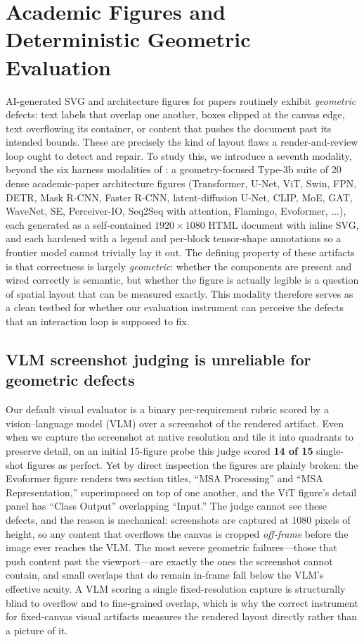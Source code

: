 \section{Academic Figures and Deterministic Geometric Evaluation}\label{sec:geometric}

AI-generated SVG and architecture figures for papers routinely exhibit
\emph{geometric} defects: text labels that overlap one another, boxes clipped at
the canvas edge, text overflowing its container, or content that pushes the
document past its intended bounds. These are precisely the kind of layout flaws a
render-and-review loop ought to detect and repair. To study this, we introduce a
seventh modality, beyond the six harness modalities of : a
geometry-focused Type-3b suite of 20 dense academic-paper architecture figures
(Transformer, U-Net, ViT, Swin, FPN, DETR, Mask R-CNN, Faster R-CNN,
latent-diffusion U-Net, CLIP, MoE, GAT, WaveNet, SE, Perceiver-IO, Seq2Seq with
attention, Flamingo, Evoformer, $\dots$), each generated as a self-contained
$1920\times1080$ HTML document with inline SVG, and each hardened with a legend
and per-block tensor-shape annotations so a frontier model cannot trivially lay
it out. The defining property of these artifacts is that correctness is largely
\emph{geometric}: whether the components are present and wired correctly is
semantic, but whether the figure is actually legible is a question of spatial
layout that can be measured exactly. This modality therefore
serves as a clean testbed for whether our evaluation instrument can perceive the
defects that an interaction loop is supposed to fix.

\subsection{VLM screenshot judging is unreliable for geometric defects}

Our default visual evaluator is a binary per-requirement rubric scored by a
vision--language model (VLM) over a screenshot of the rendered artifact. Even
when we capture the screenshot at native resolution and tile it into quadrants to
preserve detail, on an initial 15-figure probe this judge scored \textbf{14 of
15} single-shot figures as perfect. Yet by direct inspection the figures are plainly broken: the Evoformer
figure renders two section titles, ``MSA Processing'' and ``MSA
Representation,'' superimposed on top of one another, and the ViT figure's detail
panel has ``Class Output'' overlapping ``Input.'' The judge cannot see these
defects, and the reason is mechanical: screenshots are captured at $1080$ pixels
of height, so any content that overflows the canvas is cropped \emph{off-frame}
before the image ever reaches the VLM. The most severe geometric failures---those
that push content past the viewport---are exactly the ones the screenshot cannot
contain, and small overlaps that do remain in-frame fall below the VLM's
effective acuity. A VLM scoring a single fixed-resolution capture is
structurally blind to overflow and to fine-grained overlap, which is why the
correct instrument for fixed-canvas visual artifacts measures the rendered
layout directly rather than a picture of it.

